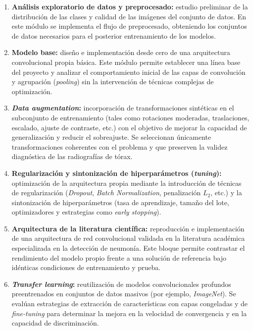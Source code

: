 \documentclass[11pt, a4paper]{article}
\numberwithin{equation}{section}
\begin{document}
\begin{enumerate}
\item \textbf{Análisis exploratorio de datos y preprocesado:} estudio preliminar de la distribución de las clases y calidad de las imágenes del conjunto de datos. En este módulo se implementa el flujo de preprocesado, obteniendo los conjuntos de datos necesarios para el posterior entrenamiento de los modelos.

\item \textbf{Modelo base:} diseño e implementación desde cero de una arquitectura convolucional propia básica. Este módulo permite establecer una línea base del proyecto y analizar el comportamiento inicial de las capas de convolución y agrupación (\textit{pooling}) sin la intervención de técnicas complejas de optimización.

\item \textbf{\textit{Data augmentation}:} incorporación de transformaciones sintéticas en el subconjunto de entrenamiento (tales como rotaciones moderadas, traslaciones, escalado, ajuste de contraste, etc.) con el objetivo de mejorar la capacidad de generalización y reducir el sobreajuste. Se seleccionan únicamente transformaciones coherentes con el problema y que preserven la validez diagnóstica de las radiografías de tórax.

\item \textbf{Regularización y sintonización de hiperparámetros (\textit{tuning}):} optimización de la arquitectura propia mediante la introducción de técnicas de regularización (\textit{Dropout}, \textit{Batch Normalization}, penalización $L_2$, etc.) y la sintonización de hiperparámetros (tasa de aprendizaje, tamaño del lote, optimizadores y estrategias como \textit{early stopping}).

\item \textbf{Arquitectura de la literatura científica:} reproducción e implementación de una arquitectura de red convolucional validada en la literatura académica especializada en la detección de neumonía. Este bloque permite contrastar el rendimiento del modelo propio frente a una solución de referencia bajo idénticas condiciones de entrenamiento y prueba.

\item \textbf{\textit{Transfer learning}:} reutilización de modelos convolucionales profundos preentrenados en conjuntos de datos masivos (por ejemplo, \textit{ImageNet}). Se evalúan estrategias de extracción de características con capas congeladas y de \textit{fine-tuning} para determinar la mejora en la velocidad de convergencia y en la capacidad de discriminación.

\end{enumerate}
\end{document}
